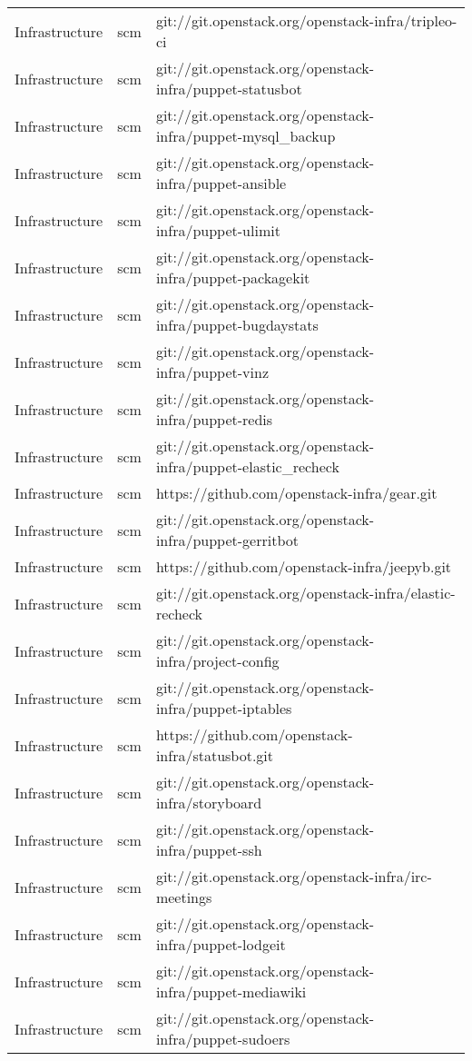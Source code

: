 \begin{center}
\begin{longtable}{|p{4cm}|p{1cm}|p{10cm}|}
Infrastructure&scm&git://git.openstack.org/openstack-infra/tripleo-ci\\
Infrastructure&scm&git://git.openstack.org/openstack-infra/puppet-statusbot\\
Infrastructure&scm&git://git.openstack.org/openstack-infra/puppet-mysql\_backup\\
Infrastructure&scm&git://git.openstack.org/openstack-infra/puppet-ansible\\
Infrastructure&scm&git://git.openstack.org/openstack-infra/puppet-ulimit\\
Infrastructure&scm&git://git.openstack.org/openstack-infra/puppet-packagekit\\
Infrastructure&scm&git://git.openstack.org/openstack-infra/puppet-bugdaystats\\
Infrastructure&scm&git://git.openstack.org/openstack-infra/puppet-vinz\\
Infrastructure&scm&git://git.openstack.org/openstack-infra/puppet-redis\\
Infrastructure&scm&git://git.openstack.org/openstack-infra/puppet-elastic\_recheck\\
Infrastructure&scm&https://github.com/openstack-infra/gear.git\\
Infrastructure&scm&git://git.openstack.org/openstack-infra/puppet-gerritbot\\
Infrastructure&scm&https://github.com/openstack-infra/jeepyb.git\\
Infrastructure&scm&git://git.openstack.org/openstack-infra/elastic-recheck\\
Infrastructure&scm&git://git.openstack.org/openstack-infra/project-config\\
Infrastructure&scm&git://git.openstack.org/openstack-infra/puppet-iptables\\
Infrastructure&scm&https://github.com/openstack-infra/statusbot.git\\
Infrastructure&scm&git://git.openstack.org/openstack-infra/storyboard\\
Infrastructure&scm&git://git.openstack.org/openstack-infra/puppet-ssh\\
Infrastructure&scm&git://git.openstack.org/openstack-infra/irc-meetings\\
Infrastructure&scm&git://git.openstack.org/openstack-infra/puppet-lodgeit\\
Infrastructure&scm&git://git.openstack.org/openstack-infra/puppet-mediawiki\\
Infrastructure&scm&git://git.openstack.org/openstack-infra/puppet-sudoers\\

\end{longtable}
\end{center}
